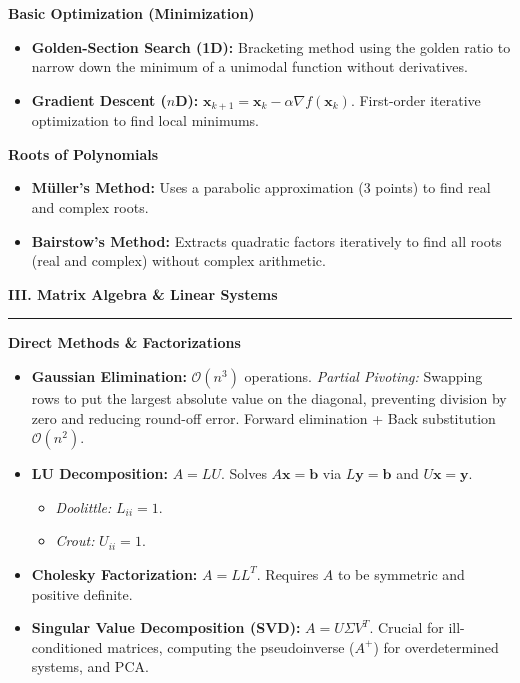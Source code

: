 \documentclass[10pt, landscape, twocolumn]{article}
\newcommand{\cheatsheetsection}[1]{
    \vspace{0.6em}
    {\color{themeblue}\large\bfseries #1} \par
    \vspace{-0.5em}
    {\color{themeblue}\rule{\linewidth}{1pt}} \par
    \vspace{0.2em}
}
\newcommand{\cheatsheetsubsection}[1]{
    \vspace{0.4em}
    {\color{themeblue}\normalsize\bfseries #1} \par
    \vspace{0.1em}
}
\begin{document}
\cheatsheetsubsection{Basic Optimization (Minimization)}
\begin{itemize}[leftmargin=*, nosep]
    \item \textbf{Golden-Section Search (1D):} Bracketing method using the golden ratio to narrow down the minimum of a unimodal function without derivatives.
    \item \textbf{Gradient Descent ($n$D):} $\mathbf{x}_{k+1} = \mathbf{x}_k - \alpha \nabla f(\mathbf{x}_k)$. First-order iterative optimization to find local minimums.
\end{itemize}

\cheatsheetsubsection{Roots of Polynomials}
\begin{itemize}[leftmargin=*, nosep]
    \item \textbf{Müller's Method:} Uses a parabolic approximation (3 points) to find real and complex roots.
    \item \textbf{Bairstow's Method:} Extracts quadratic factors iteratively to find all roots (real and complex) without complex arithmetic.
\end{itemize}

\cheatsheetsection{III. Matrix Algebra \& Linear Systems}

\cheatsheetsubsection{Direct Methods \& Factorizations}
\begin{itemize}[leftmargin=*, nosep]
    \item \textbf{Gaussian Elimination:} $\mathcal{O}(n^3)$ operations. 
    \textit{Partial Pivoting:} Swapping rows to put the largest absolute value on the diagonal, preventing division by zero and reducing round-off error. Forward elimination + Back substitution $\mathcal{O}(n^2)$.
    \item \textbf{LU Decomposition:} $A = LU$. Solves $A\mathbf{x} = \mathbf{b}$ via $L\mathbf{y} = \mathbf{b}$ and $U\mathbf{x} = \mathbf{y}$.
    \begin{itemize}[leftmargin=*, nosep]
        \item \textit{Doolittle:} $L_{ii} = 1$.
        \item \textit{Crout:} $U_{ii} = 1$.
    \end{itemize}
    \item \textbf{Cholesky Factorization:} $A = LL^T$. Requires $A$ to be symmetric and positive definite.
    \item \textbf{Singular Value Decomposition (SVD):} $A = U \Sigma V^T$. Crucial for ill-conditioned matrices, computing the pseudoinverse ($A^+$) for overdetermined systems, and PCA.
\end{itemize}
\end{document}
